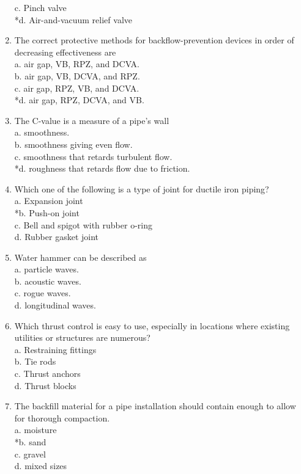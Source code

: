 \begin{enumerate}[1.]
c. Pinch valve\\
*d. Air-and-vacuum relief valve\\
\item The correct protective methods for backflow-prevention devices in order of decreasing effectiveness are\\
a. air gap, VB, RPZ, and DCVA.\\
b. air gap, VB, DCVA, and RPZ.\\
c. air gap, RPZ, VB, and DCVA.\\
*d. air gap, RPZ, DCVA, and VB.\\
\item The C-value is a measure of a pipe's wall\\
a. smoothness.\\
b. smoothness giving even flow.\\
c. smoothness that retards turbulent flow.\\
*d. roughness that retards flow due to friction.\\
\item Which one of the following is a type of joint for ductile iron piping?\\
a. Expansion joint\\
*b. Push-on joint\\
c. Bell and spigot with rubber o-ring\\
d. Rubber gasket joint\\
\item Water hammer can be described as\\
a. particle waves.\\
b. acoustic waves.\\
c. rogue waves.\\
d. longitudinal waves.\\
\item Which thrust control is easy to use, especially in locations where existing utilities or structures are numerous?\\
a. Restraining fittings\\
b. Tie rods\\
c. Thrust anchors\\
d. Thrust blocks 
\item The backfill material for a pipe installation should contain enough to allow for thorough compaction.\\
a. moisture\\
*b. sand\\
c. gravel\\
d. mixed sizes\\

\end{enumerate}
